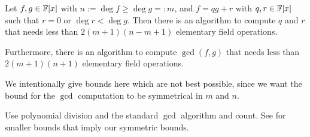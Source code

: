 

\begin{Prop}
\label{standardgcd}
%
%
Let $f,g \in \mathbb{F}[x]$ with $n := \deg f \ge \deg g =: m$, and $f = qg + r$
with $q,r \in \mathbb{F}[x]$ such that $r=0$ or $\deg r < \deg g$. Then there is an
algorithm to compute $q$ and $r$ that needs less than $2(m+1)(n-m+1)$ 
elementary field operations. 

Furthermore, there is an
algorithm to compute $\gcd(f,g)$ that needs less than
$2(m+1)(n+1)$ elementary field operations.
\end{Prop}

\begin{Rem}{We intentionally give bounds here which are not best possible,
since we want the bound for the $\gcd$ computation to be symmetrical in
$m$ and $n$.}
\end{Rem}

Use polynomial division and the standard $\gcd$ algorithm
and count. See \cite[Section 2.4 and Section 3.3]{vzG} for
smaller bounds that imply our symmetric bounds.
%
\proofend

